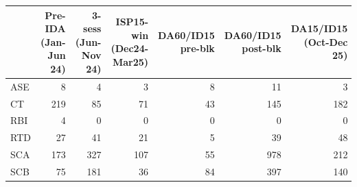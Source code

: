\begin{tabular}{lrrrrrr}
\toprule
 & Pre-IDA (Jan-Jun 24) & 3-sess (Jun-Nov 24) & ISP15-win (Dec24-Mar25) & DA60/ID15 pre-blk & DA60/ID15 post-blk & DA15/ID15 (Oct-Dec 25) \\
\midrule
ASE & 8 & 4 & 3 & 8 & 11 & 3 \\
CT & 219 & 85 & 71 & 43 & 145 & 182 \\
RBI & 4 & 0 & 0 & 0 & 0 & 0 \\
RTD & 27 & 41 & 21 & 5 & 39 & 48 \\
SCA & 173 & 327 & 107 & 55 & 978 & 212 \\
SCB & 75 & 181 & 36 & 84 & 397 & 140 \\
\bottomrule
\end{tabular}
